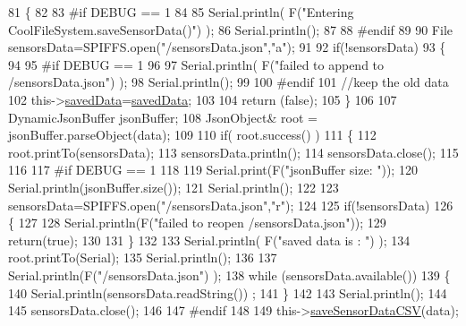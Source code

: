 \begin{DoxyCode}
81 \{
82 
83 \textcolor{preprocessor}{#if DEBUG == 1}
84 
85     Serial.println( F(\textcolor{stringliteral}{"Entering CoolFileSystem.saveSensorData()"}) );
86     Serial.println();
87 
88 \textcolor{preprocessor}{#endif}
89     
90     File sensorsData=SPIFFS.open(\textcolor{stringliteral}{"/sensorsData.json"},\textcolor{stringliteral}{"a"});
91 
92     \textcolor{keywordflow}{if}(!sensorsData)
93     \{
94     
95 \textcolor{preprocessor}{    #if DEBUG == 1}
96     
97         Serial.println( F(\textcolor{stringliteral}{"failed to append to /sensorsData.json"}) );
98         Serial.println();
99     
100 \textcolor{preprocessor}{    #endif}
101         \textcolor{comment}{//keep the old data}
102         this->\hyperlink{class_cool_file_system_ad9f5b739a32100f5f21270c3d9ee2b1d}{savedData}=\hyperlink{class_cool_file_system_ad9f5b739a32100f5f21270c3d9ee2b1d}{savedData};
103 
104         \textcolor{keywordflow}{return} (\textcolor{keyword}{false}); 
105     \}   
106 
107     DynamicJsonBuffer jsonBuffer;
108     JsonObject& root = jsonBuffer.parseObject(data);
109 
110     \textcolor{keywordflow}{if}( root.success() )
111     \{
112         root.printTo(sensorsData);
113         sensorsData.println();
114         sensorsData.close();
115 
116 
117 \textcolor{preprocessor}{    #if DEBUG == 1}
118         
119         Serial.print(F(\textcolor{stringliteral}{"jsonBuffer size: "}));
120         Serial.println(jsonBuffer.size());
121         Serial.println();
122 
123         sensorsData=SPIFFS.open(\textcolor{stringliteral}{"/sensorsData.json"},\textcolor{stringliteral}{"r"});
124         
125         \textcolor{keywordflow}{if}(!sensorsData)
126         \{
127             
128             Serial.println(F(\textcolor{stringliteral}{"failed to reopen /sensorsData.json"}));
129             \textcolor{keywordflow}{return}(\textcolor{keyword}{true});
130                         
131         \}
132     
133         Serial.println( F(\textcolor{stringliteral}{"saved data is : "}) );
134         root.printTo(Serial);
135         Serial.println();
136 
137         Serial.println(F(\textcolor{stringliteral}{"/sensorsData.json"}) );
138         \textcolor{keywordflow}{while} (sensorsData.available()) 
139         \{
140             Serial.println(sensorsData.readString()) ;
141         \}
142         
143         Serial.println();
144         
145         sensorsData.close();
146     
147 \textcolor{preprocessor}{    #endif}
148 
149         this->\hyperlink{class_cool_file_system_ab78704d5d21ce10fc6f1138ab5ab46c8}{saveSensorDataCSV}(data);     

\end{DoxyCode}
